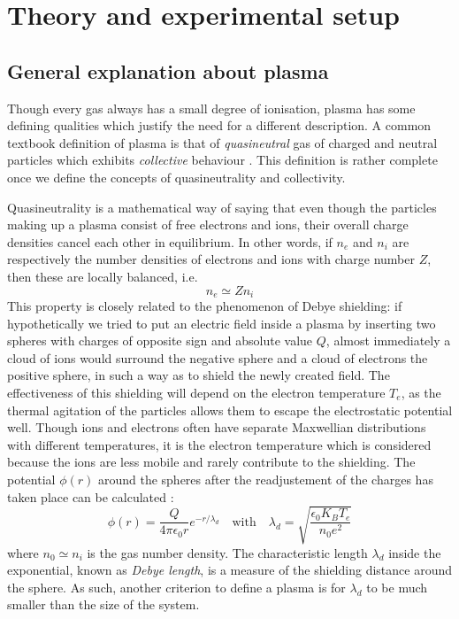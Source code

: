 \section{Theory and experimental setup}

\subsection{General explanation about plasma}
Though every gas always has a small degree of ionisation, plasma has some defining qualities which justify the need for a different description.
A common textbook definition of plasma is that of \emph{quasineutral} gas of charged and neutral particles which exhibits \emph{collective} behaviour \cite{chen_introduction_2006}.
This definition is rather complete once we define the concepts of quasineutrality and collectivity.

Quasineutrality is a mathematical way of saying that even though the particles making up a plasma consist of free electrons and ions, 
their overall charge densities cancel each other in equilibrium\cite{gibbon_introduction_2016}.
In other words, if $n_e$ and $n_i$ are respectively the number densities of electrons and ions with charge number $Z$, then these are locally balanced, i.e.
\begin{equation}
    n_e \simeq Z n_i
\end{equation}
This property is closely related to the phenomenon of Debye shielding:
if hypothetically we tried to put an electric field inside a plasma by inserting two spheres with charges of opposite sign and absolute value $Q$, almost immediately a cloud of ions would surround the negative sphere and a cloud of electrons the positive sphere, in such a way as to shield the newly created field.
The effectiveness of this shielding will depend on the electron temperature $T_e$, as the thermal agitation of the particles allows them to escape the electrostatic potential well.
Though ions and electrons often have separate Maxwellian distributions with different temperatures, it is the electron temperature which is considered because the ions are less mobile and rarely contribute to the shielding\cite{chen_introduction_2006}.
The potential $\phi(r)$ around the spheres after the readjustement of the charges has taken place can be calculated \cite{sanjines_notice_2014}:
\begin{equation}
    \phi(r) = \frac{Q}{4\pi \epsilon_0 r} e^{-r / \lambda_d} \quad \mathrm{with} \quad \lambda_d = \sqrt{\frac{\epsilon_0 K_B T_e}{n_0 e^2}}
\end{equation}
where $n_0 \simeq n_i$ is the gas number density\cite{gibbon_introduction_2016}.
The characteristic length $\lambda_d$ inside the exponential, known as \emph{Debye length}, is a measure of the shielding distance around the sphere.
As such, another criterion to define a plasma is for $\lambda_d$ to be much smaller than the size of the system.

